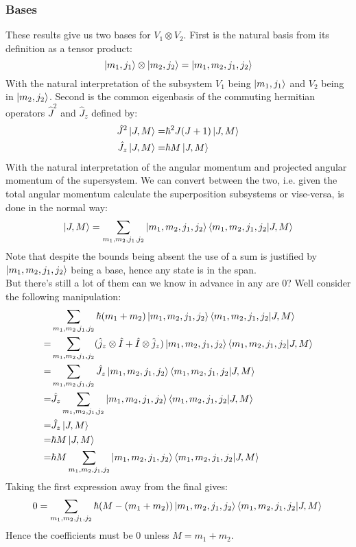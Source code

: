\subsubsection{Bases}
These results give us two bases for $V_1\otimes V_2$.
First is the natural basis from its definition as a tensor product:
\[\left|m_1,j_1\right\rangle\otimes\left|m_2,j_2\right\rangle = \left|m_1,m_2,j_1,j_2\right\rangle\]
With the natural interpretation of the subsystem $V_1$ being $\left|m_1,j_1\right\rangle$ and $V_2$ being in $\left|m_2,j_2\right\rangle$.
Second is the common eigenbasis of the commuting hermitian operators $\hat{J}^2$ and $\hat{J}_z$ defined by:
\begin{equation*}
\begin{aligned}
	\hat{J}^2\left|J,M\right\rangle =& \hbar^2 J(J+1)\left|J,M\right\rangle\\
	\hat{J}_z\left|J,M\right\rangle =& \hbar M\left|J,M\right\rangle\\
\end{aligned}
\end{equation*}
With the natural interpretation of the angular momentum and projected angular momentum of the supersystem.
We can convert between the two,
i.e. given the total angular momentum calculate the superposition subsystems or vise-versa,
is done in the normal way:
\[\left|J,M\right\rangle = \sum_{m_1,m_2,j_1,j_2}\left|m_1,m_2,j_1,j_2\right\rangle\left\langle m_1,m_2,j_1,j_2\middle|J,M\right\rangle\]
Note that despite the bounds being absent the use of a sum is justified by $\left|m_1,m_2,j_1,j_2\right\rangle$ being a base,
hence any state is in the span.
\\

But there's still a lot of them can we know in advance in any are $0$?
Well consider the following manipulation:
\[\begin{aligned}
	&\sum_{m_1,m_2,j_1,j_2}\hbar(m_1+m_2)\left|m_1,m_2,j_1,j_2\right\rangle\left\langle m_1,m_2,j_1,j_2\middle|J,M\right\rangle\\
	=&\sum_{m_1,m_2,j_1,j_2}(\hat{j}_z\otimes\hat{I}+\hat{I}\otimes\hat{j}_z)\left|m_1,m_2,j_1,j_2\right\rangle\left\langle m_1,m_2,j_1,j_2\middle|J,M\right\rangle\\
	=&\sum_{m_1,m_2,j_1,j_2}\hat{J}_z\left|m_1,m_2,j_1,j_2\right\rangle\left\langle m_1,m_2,j_1,j_2\middle|J,M\right\rangle\\
	=&\hat{J}_z\sum_{m_1,m_2,j_1,j_2}\left|m_1,m_2,j_1,j_2\right\rangle\left\langle m_1,m_2,j_1,j_2\middle|J,M\right\rangle\\
	=&\hat{J}_z\left|J,M\right\rangle\\
	=&\hbar M\left|J,M\right\rangle\\
	=&\hbar M\sum_{m_1,m_2,j_1,j_2}\left|m_1,m_2,j_1,j_2\right\rangle\left\langle m_1,m_2,j_1,j_2\middle|J,M\right\rangle\\
\end{aligned}\]
Taking the first expression away from the final gives:
\[
	0=\sum_{m_1,m_2,j_1,j_2}\hbar(M-(m_1+m_2))\left|m_1,m_2,j_1,j_2\right\rangle\left\langle m_1,m_2,j_1,j_2\middle|J,M\right\rangle\\
\]
Hence the coefficients must be $0$ unless $M=m_1+m_2$.

